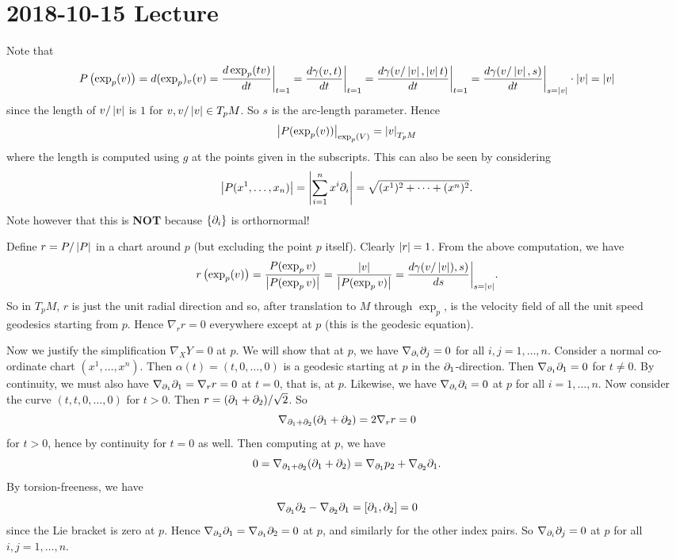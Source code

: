 \section{2018-10-15 Lecture}

Note that
\[ P\left( \exp_p(v) \right) = d(\exp_p)_v(v) = \frac{d\exp_p(tv)}{dt}\bigg\vert_{t=1} = \frac{d\gamma(v,t)}{dt}\bigg\vert_{t=1} = \frac{d\gamma(v/\left\lvert v \right\rvert,\left\lvert v \right\rvert t)}{dt}\bigg\vert_{t=1} = \frac{d\gamma(v/\left\lvert v \right\rvert,s)}{dt}\bigg\vert_{s=\left\lvert v \right\rvert}\cdot\left\lvert v \right\rvert = \left\lvert v \right\rvert \]
since the length of $v/\left\lvert v \right\rvert$ is $1$ for $v,v/\left\lvert v \right\rvert\in T_pM$.
So $s$ is the arc-length parameter.
Hence
\[ \left\lvert P(\exp_p(v)) \right\rvert_{\exp_p(V)} = \left\lvert v \right\rvert_{T_pM} \]
where the length is computed using $g$ at the points given in the subscripts.
This can also be seen by considering
\[ \left\lvert P(x^1,\ldots,x_n) \right\rvert=\left\lvert \sum_{i=1}^nx^i\partial_i \right\rvert=\sqrt{(x^1)^2+\cdots+(x^n)^2}. \]
Note however that this is \textbf{NOT} because $\{\partial_i\}$ is orthornormal!

Define $r=P/\left\lvert P \right\rvert$ in a chart around $p$ (but excluding the point $p$ itself).
Clearly $\left\lvert r \right\rvert=1$.
From the above computation, we have
\[ r\left( \exp_p(v) \right) = \frac{P(\exp_pv)}{\left\lvert P(\exp_pv) \right\rvert} = \frac{\left\lvert v \right\rvert}{\left\lvert P(\exp_pv) \right\rvert} = \frac{d\gamma(v/\left\lvert v \right\rvert),s)}{ds}\bigg\vert_{s=\left\lvert v \right\rvert}. \]
So in $T_pM$, $r$ is just the unit radial direction and so, after translation to $M$ through $\exp_p$, is the velocity field of all the unit speed geodesics starting from $p$.
Hence $\nabla_rr=0$ everywhere except at $p$ (this is the geodesic equation).

Now we justify the simplification $\nabla_XY=0$ at $p$.
We will show that at $p$, we have $\nabla_{\partial_i}\partial_j=0$ for all $i,j=1,\ldots,n$.
Consider a normal co-ordinate chart $(x^1,\ldots,x^n)$.
Then $\alpha(t)=(t,0,\ldots,0)$ is a geodesic starting at $p$ in the $\partial_1$-direction.
Then $\nabla_{\partial_1}\partial_1=0$ for $t\neq0$.
By continuity, we must also have $\nabla_{\partial_1}\partial_1=\nabla_rr=0$ at $t=0$, that is, at $p$.
Likewise, we have $\nabla_{\partial_i}\partial_i=0$ at $p$ for all $i=1,\ldots,n$.
Now consider the curve $(t,t,0,\ldots,0)$ for $t>0$.
Then $r=(\partial_1+\partial_2)/\sqrt{2}$.
So
\[ \nabla_{\partial_1+\partial_2}(\partial_1+\partial_2)=2\nabla_rr=0 \]
for $t>0$, hence by continuity for $t=0$ as well.
Then computing at $p$, we have
\[ 0 = \nabla_{\partial_1+\partial_2}(\partial_1+\partial_2) = \nabla_{\partial_1}p_2 + \nabla_{\partial_2}\partial_1. \]
By torsion-freeness, we have
\[ \nabla_{\partial_1}\partial_2-\nabla_{\partial_2}\partial_1=[\partial_1,\partial_2]=0 \]
since the Lie bracket is zero at $p$.
Hence $\nabla_{\partial_2}\partial_1=\nabla_{\partial_1}\partial_2=0$ at $p$, and similarly for the other index pairs.
So $\nabla_{\partial_i}\partial_j=0$ at $p$ for all $i,j=1,\ldots,n$.

